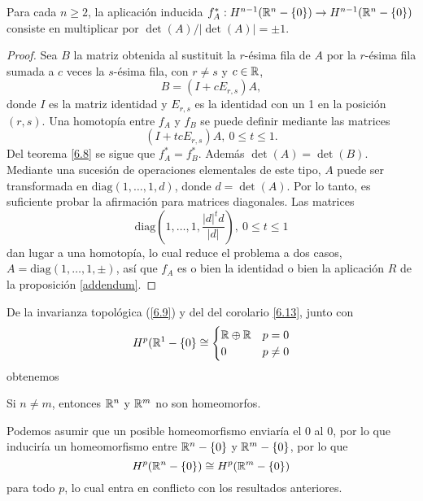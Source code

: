 \documentclass[CV.tex]{subfiles}
\begin{document}
\begin{coro}\label{multiplica}
Para cada $n\geq 2$, la aplicación inducida $f_A^*:H^{n-1}(\mathbb{R}^n-\{0\})\to H^{n-1}(\mathbb{R}^n-\{0\})$ consiste en multiplicar por $\det(A)/|\det(A)|=\pm 1$.
\end{coro}
\begin{proof}
Sea $B$ la matriz obtenida al sustituit la $r$-ésima fila de $A$ por la $r$-ésima fila sumada a $c$ veces la $s$-ésima fila, con $r\neq s$ y $c\in\mathbb{R}$,
\[
B=(I+cE_{r,s})A,
\]
donde $I$ es la matriz identidad y $E_{r,s}$ es la identidad con un 1 en la posición $(r,s)$. Una homotopía entre $f_A$ y $f_B$ se puede definir mediante las matrices
\[
(I+tcE_{r,s})A,\ 0\leq t\leq 1.
\]
Del teorema \ref{6.8} se sigue que $f_A^*=f_B^*$. Además $\det(A)=\det(B)$. Mediante una sucesión de operaciones elementales de este tipo, $A$ puede ser transformada en $\mathrm{diag}(1,\dots, 1,d)$, donde $d=\det(A)$. Por lo tanto, es suficiente probar la afirmación para matrices diagonales. Las matrices
\[
\mathrm{diag}(1,\dots, 1, \frac{|d|^td}{|d|}),\ 0\leq t\leq 1
\]
dan lugar a una homotopía, lo cual reduce el problema a dos casos, $A=\mathrm{diag}(1,\dots, 1,\pm)$, así que $f_A$ es o bien la identidad o bien la aplicación $R$ de la proposición \ref{addendum}.
\end{proof}

De la invarianza topológica (\ref{6.9}) y del del corolario \ref{6.13}, junto con 
\[
H^p(\mathbb{R}^1-\{0\}\cong\begin{cases}
\mathbb{R}\oplus\mathbb{R} & p=0\\
0 & p\neq 0
\end{cases}
\]
obtenemos

\begin{prop}
Si $n\neq m$, entonces $\mathbb{R}^n$ y $\mathbb{R}^m$ no son homeomorfos. 
\end{prop}
\begin{dem}
Podemos asumir que un posible homeomorfismo enviaría el 0 al 0, por lo que induciría un homeomorfismo entre $\mathbb{R}^n-\{0\}$ y $\mathbb{R}^m-\{0\}$, por lo que
\[
H^p(\mathbb{R}^n-\{0\})\cong H^p(\mathbb{R}^m-\{0\})
\]
para todo $p$, lo cual entra en conflicto con los resultados anteriores.
\QED
\end{dem}
\end{document}
